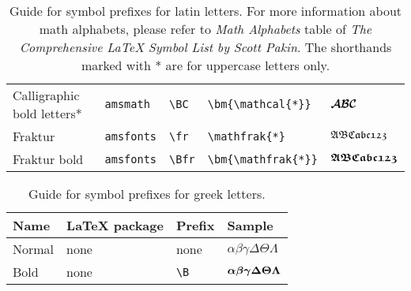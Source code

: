 \documentclass[]{article}
\begin{document}
\begin{table}[htbp]
\begin{tabular}{p{14em} l l l l}
    Calligraphic bold letters* & \texttt{amsmath} & \verb+\BC+ & \verb+\bm{\mathcal{*}}+ & $\bm{\mathcal{A}}\bm{\mathcal{B}}\bm{\mathcal{C}}$ \\
    Fraktur & \texttt{amsfonts} & \verb+\fr+ & \verb+\mathfrak{*}+ & $\mathfrak{A}\mathfrak{B}\mathfrak{C}\mathfrak{a}\mathfrak{b}\mathfrak{c}\mathfrak{1}\mathfrak{2}\mathfrak{3}$\\
    Fraktur bold & \texttt{amsfonts} & \verb+\Bfr+ & \verb+\bm{\mathfrak{*}}+ & $\bm{\mathfrak{A}}\bm{\mathfrak{B}}\bm{\mathfrak{C}}\bm{\mathfrak{a}}\bm{\mathfrak{b}}\bm{\mathfrak{c}}\bm{\mathfrak{1}}\bm{\mathfrak{2}}\bm{\mathfrak{3}}$\\
    \bottomrule
  \end{tabular}
  \caption{Guide for symbol prefixes for latin letters. For more information about math alphabets,
    please refer to {\em Math Alphabets} table of
    \emph{The Comprehensive \LaTeX{} Symbol List by Scott Pakin}.
    The shorthands marked with * are for uppercase letters only.}
  \label{tb:math}
\end{table}



\begin{table}[htbp]
  \centering
\begin{tabular}{p{14em} l l l}
  \toprule
  Name & \LaTeX{} package & Prefix & Sample \\
  \midrule
  Normal & none & none & $\alpha\beta\gamma\Delta\Theta\Lambda$ \\
  Bold & none & \verb+\B+ & $\bm{\alpha}\bm{\beta}\bm{\gamma}\bm{\Delta}\bm{\Theta}\bm{\Lambda}$ \\
  \bottomrule
\end{tabular}
\caption{Guide for symbol prefixes for greek letters.}
\label{tb:greek1}
\end{table}
\end{document}
